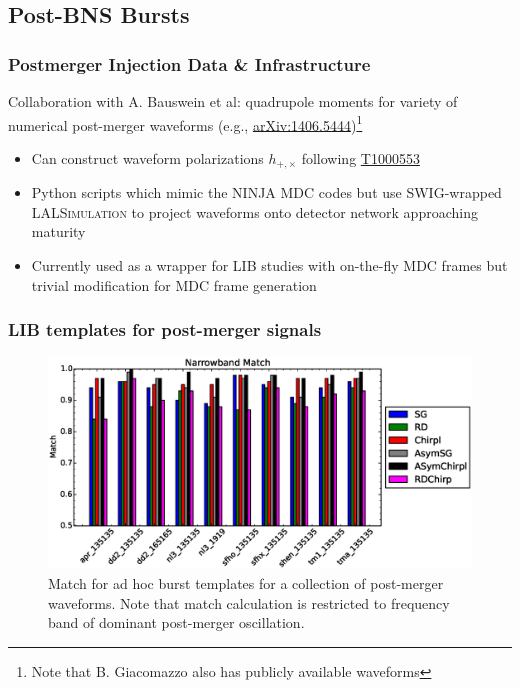 \documentclass{beamer}
\begin{document}
\subsection{Post-BNS Bursts}
\begin{frame}\frametitle{Postmerger Injection Data \& Infrastructure} 
    Collaboration with A. Bauswein et al: quadrupole moments for variety of
    numerical post-merger waveforms (e.g.,
    \href{http://arxiv.org/abs/1406.5444}{arXiv:1406.5444})\footnote{Note that B.
    Giacomazzo also has publicly available waveforms}
    \begin{itemize}
        \item Can construct waveform polarizations $h_{+,\times}$ following
            \href{https://dcc.ligo.org/cgi-bin/private/DocDB/ShowDocument?.submit=Number&docid=T1000553&version=}{T1000553}
        \item Python scripts which mimic the \textsc{NINJA} MDC codes but use
            \textsc{SWIG}-wrapped \textsc{LALSimulation} to project waveforms onto
            detector network approaching maturity
        \item Currently used as a wrapper for \textsc{LIB} studies with
            on-the-fly MDC frames but trivial modification for MDC frame
            generation 
    \end{itemize}
\end{frame}

\begin{frame}
    \frametitle{\textsc{LIB} templates for post-merger signals}

    \begin{figure}
        \includegraphics[scale=0.4]{nb_match.eps} 
        \caption{Match for ad hoc burst templates for a collection of
        post-merger waveforms.  Note that match calculation is restricted to frequency
    band of dominant post-merger oscillation.}
    \end{figure}

\end{frame}
\end{document}
